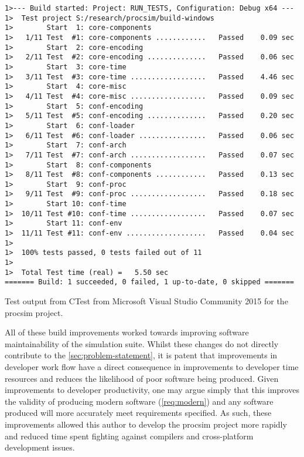 \begin{listing}[hb]
\begin{verbatim}
1>--- Build started: Project: RUN_TESTS, Configuration: Debug x64 ---
1>  Test project S:/research/procsim/build-windows
1>        Start  1: core-components
1>   1/11 Test  #1: core-components ............   Passed    0.09 sec
1>        Start  2: core-encoding
1>   2/11 Test  #2: core-encoding ..............   Passed    0.06 sec
1>        Start  3: core-time
1>   3/11 Test  #3: core-time ..................   Passed    4.46 sec
1>        Start  4: core-misc
1>   4/11 Test  #4: core-misc ..................   Passed    0.09 sec
1>        Start  5: conf-encoding
1>   5/11 Test  #5: conf-encoding ..............   Passed    0.20 sec
1>        Start  6: conf-loader
1>   6/11 Test  #6: conf-loader ................   Passed    0.06 sec
1>        Start  7: conf-arch
1>   7/11 Test  #7: conf-arch ..................   Passed    0.07 sec
1>        Start  8: conf-components
1>   8/11 Test  #8: conf-components ............   Passed    0.13 sec
1>        Start  9: conf-proc
1>   9/11 Test  #9: conf-proc ..................   Passed    0.18 sec
1>        Start 10: conf-time
1>  10/11 Test #10: conf-time ..................   Passed    0.07 sec
1>        Start 11: conf-env
1>  11/11 Test #11: conf-env ...................   Passed    0.04 sec
1>
1>  100% tests passed, 0 tests failed out of 11
1>
1>  Total Test time (real) =   5.50 sec
======= Build: 1 succeeded, 0 failed, 1 up-to-date, 0 skipped =======
\end{verbatim}
\caption{Test output from CTest \cite{CMake:CTest} from Microsoft Visual Studio Community 2015 for the procsim project.}
\label{lst:lua:ctest-output}
\end{listing}  

All of these build improvements worked towards improving software maintainability of the simulation suite. Whilst these changes do not directly contribute to the \cref{sec:problem-statement}, it is patent that improvements in developer work flow have a direct consequence in improvements to developer time resources and reduces the likelihood of poor software being produced. Given improvements to developer productivity, one may argue simply that this improves the validity of producing modern software (\cref{req:modern}) and any software produced will more accurately meet requirements specified. As such, these improvements allowed this author to develop the procsim project more rapidly and reduced time spent fighting against compilers and cross-platform development issues.


